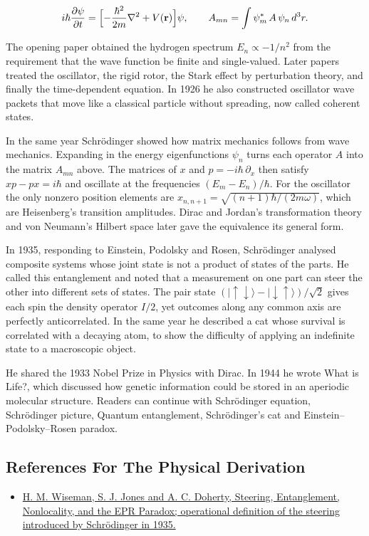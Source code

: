 \documentclass[11pt,oneside]{book}
\newenvironment{centeredalign}{\[\begin{gathered}[c]}{\end{gathered}\]}
\newcommand{\ket}[1]{\lvert #1\rangle}
\begin{document}
\begin{centeredalign}
i\hbar\frac{\partial\psi}{\partial t}=\Bigl[-\frac{\hbar^2}{2m}\nabla^2+V(\mathbf r)\Bigr]\psi,
\qquad A_{mn}=\int\psi_m^*\,A\,\psi_n\,d^3r .
\end{centeredalign}

The opening paper obtained the hydrogen spectrum \(E_n\propto-1/n^2\) from the requirement that the wave function be finite and single-valued. Later papers treated the oscillator, the rigid rotor, the Stark effect by perturbation theory, and finally the time-dependent equation. In 1926 he also constructed oscillator wave packets that move like a classical particle without spreading, now called coherent states.

In the same year Schrödinger showed how matrix mechanics follows from wave mechanics. Expanding in the energy eigenfunctions \(\psi_n\) turns each operator \(A\) into the matrix \(A_{mn}\) above. The matrices of \(x\) and \(p=-i\hbar\,\partial_x\) then satisfy \(xp-px=i\hbar\) and oscillate at the frequencies \((E_m-E_n)/\hbar\). For the oscillator the only nonzero position elements are \(x_{n,n+1}=\sqrt{(n+1)\hbar/(2m\omega)}\), which are Heisenberg's transition amplitudes. Dirac and Jordan's transformation theory and von Neumann's Hilbert space later gave the equivalence its general form.

In 1935, responding to Einstein, Podolsky and Rosen, Schrödinger analysed composite systems whose joint state is not a product of states of the parts. He called this entanglement and noted that a measurement on one part can steer the other into different sets of states. The pair state \((\ket{\uparrow\downarrow}-\ket{\downarrow\uparrow})/\sqrt2\) gives each spin the density operator \(I/2\), yet outcomes along any common axis are perfectly anticorrelated. In the same year he described a cat whose survival is correlated with a decaying atom, to show the difficulty of applying an indefinite state to a macroscopic object.

He shared the 1933 Nobel Prize in Physics with Dirac. In 1944 he wrote What is Life?, which discussed how genetic information could be stored in an aperiodic molecular structure. Readers can continue with Schrödinger equation, Schrödinger picture, Quantum entanglement, Schrödinger's cat and Einstein--Podolsky--Rosen paradox.

\subsection*{References For The Physical Derivation}
\begin{itemize}
\item \href{https://arxiv.org/abs/quant-ph/0612147}{H. M. Wiseman, S. J. Jones and A. C. Doherty, Steering, Entanglement, Nonlocality, and the EPR Paradox; operational definition of the steering introduced by Schrödinger in 1935.}
\end{itemize}
\end{document}
